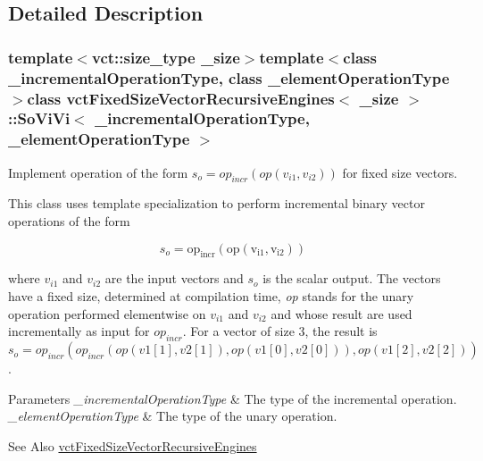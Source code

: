 \subsection{Detailed Description}
\subsubsection*{template$<$vct\-::size\-\_\-type \-\_\-size$>$template$<$class \-\_\-incremental\-Operation\-Type, class \-\_\-element\-Operation\-Type$>$class vct\-Fixed\-Size\-Vector\-Recursive\-Engines$<$ \-\_\-size $>$\-::\-So\-Vi\-Vi$<$ \-\_\-incremental\-Operation\-Type, \-\_\-element\-Operation\-Type $>$}

Implement operation of the form $s_o = op_{incr}(op(v_{i1}, v_{i2}))$ for fixed size vectors. 

This class uses template specialization to perform incremental binary vector operations of the form

\[ s_o = \mathrm{op_{incr}(\mathrm{op}(v_{i1}, v_{i2}))} \]

where $v_{i1}$ and $v_{i2}$ are the input vectors and $s_o$ is the scalar output. The vectors have a fixed size, determined at compilation time, {\itshape op} stands for the unary operation performed elementwise on $v_{i1}$ and $v_{i2}$ and whose result are used incrementally as input for $op_{incr}$. For a vector of size 3, the result is $s_o = op_{incr}(op_{incr}(op(v1[1], v2[1]), op(v1[0], v2[0])), op(v1[2], v2[2]))$.


\begin{DoxyParams}{Parameters}
{\em \-\_\-incremental\-Operation\-Type} & The type of the incremental operation.\\
\hline
{\em \-\_\-element\-Operation\-Type} & The type of the unary operation.\\
\hline
\end{DoxyParams}
\begin{DoxySeeAlso}{See Also}
\hyperlink{classvct_fixed_size_vector_recursive_engines}{vct\-Fixed\-Size\-Vector\-Recursive\-Engines} 
\end{DoxySeeAlso}


